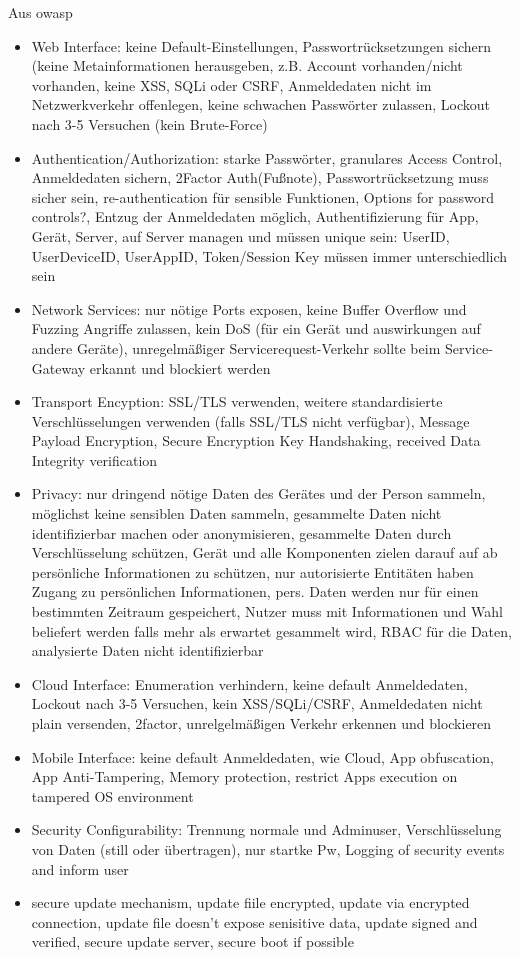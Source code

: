     
    Aus \gls{owasp}
    \begin{itemize}[noitemsep]
        \item Web Interface: keine Default-Einstellungen, Passwortrücksetzungen sichern (keine Metainformationen herausgeben, z.B. Account vorhanden/\-nicht vorhanden, keine XSS, SQLi oder CSRF, Anmeldedaten nicht im Netzwerkverkehr offenlegen, keine schwachen Passwörter zulassen, Lockout nach 3-5 Versuchen (kein Brute-Force)
        \item Authentication/\-Authorization: starke Passwörter, granulares Access Control, Anmeldedaten sichern, 2Factor Auth(Fußnote), Passwortrücksetzung muss sicher sein, re-authentication für sensible Funktionen, Options for password controls?, Entzug der Anmeldedaten möglich, Authentifizierung für App, Gerät, Server, auf Server managen und müssen unique sein: UserID, UserDeviceID, UserAppID, Token/\-Session Key müssen immer unterschiedlich sein
        \item Network Services: nur nötige Ports exposen, keine Buffer Overflow und Fuzzing Angriffe zulassen, kein DoS (für ein Gerät und auswirkungen auf andere Geräte), unregelmäßiger Servicerequest-Verkehr sollte beim Service-Gateway erkannt und blockiert werden
        \item Transport Encyption: SSL/\-TLS verwenden, weitere standardisierte Verschlüsselungen verwenden (falls SSL/\-TLS nicht verfügbar), Message Payload Encryption, Secure Encryption Key Handshaking, received Data Integrity verification
        \item Privacy: nur dringend nötige Daten des Gerätes und der Person sammeln, möglichst keine sensiblen Daten sammeln, gesammelte Daten nicht identifizierbar machen oder anonymisieren, gesammelte Daten durch Verschlüsselung schützen, Gerät und alle Komponenten zielen darauf auf ab persönliche Informationen zu schützen, nur autorisierte Entitäten haben Zugang zu persönlichen Informationen, pers. Daten werden nur für einen bestimmten Zeitraum gespeichert, Nutzer muss mit Informationen und Wahl beliefert werden falls mehr als erwartet gesammelt wird, RBAC für die Daten, analysierte Daten nicht identifizierbar
        \item Cloud Interface: Enumeration verhindern, keine default Anmeldedaten, Lockout nach 3-5 Versuchen, kein XSS/\-SQLi/\-CSRF, Anmeldedaten nicht plain versenden, 2factor, unrelgelmäßigen Verkehr erkennen und blockieren
        \item Mobile Interface: keine default Anmeldedaten, wie Cloud, App obfuscation, App Anti-Tampering, Memory protection, restrict Apps execution on tampered OS environment
        \item Security Configurability: Trennung normale und Adminuser, Verschlüsselung von Daten (still oder übertragen), nur startke Pw, Logging of security events and inform user
        \item secure update mechanism, update fiile encrypted, update via encrypted connection, update file doesn't expose senisitive data, update signed and verified, secure update server, secure boot if possible
    \end{itemize}